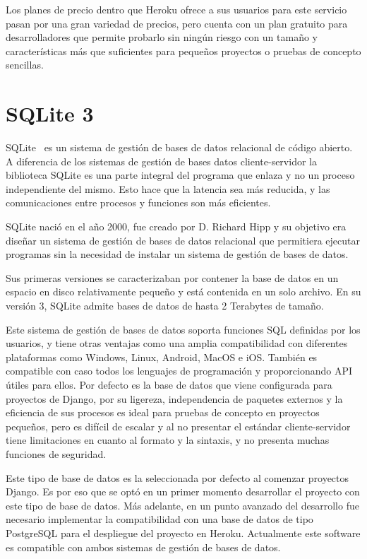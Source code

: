 \documentclass[a4paper, 12pt]{book}
\begin{document}
Los planes de precio dentro que Heroku ofrece a sus usuarios para este servicio pasan por una gran variedad de precios, pero cuenta con un plan gratuito para desarrolladores que permite probarlo sin ningún riesgo con un tamaño y características más que suficientes para pequeños proyectos o pruebas de concepto sencillas. 

\section{SQLite 3}
\label{sec:SQLite}

SQLite~\cite{sqlite} es un sistema de gestión de bases de datos relacional de código abierto.  A diferencia de los sistemas de gestión de bases datos cliente-servidor la biblioteca SQLite es una parte integral del programa que enlaza y no un proceso independiente del mismo. Esto hace que la latencia sea más reducida, y las comunicaciones entre procesos y funciones son más eficientes. 

SQLite nació en el año 2000, fue creado por D. Richard Hipp y su objetivo era diseñar un sistema de gestión de bases de datos relacional que permitiera ejecutar programas sin la necesidad de instalar un sistema de gestión de bases de datos. 

Sus primeras versiones se caracterizaban por contener la base de datos en un espacio en disco relativamente pequeño y está contenida en un solo archivo. En su versión 3, SQLite admite bases de datos de hasta 2 Terabytes de tamaño. 

Este sistema de gestión de bases de datos soporta funciones SQL definidas por los usuarios, y tiene otras ventajas como una amplia compatibilidad con diferentes plataformas como Windows, Linux, Android, MacOS e iOS. También es compatible con caso todos los lenguajes de programación y proporcionando API útiles para ellos. Por defecto es la base de datos que viene configurada para proyectos de Django, por su ligereza, independencia de paquetes externos y la eficiencia de sus procesos es ideal para pruebas de concepto en proyectos pequeños, pero es difícil de escalar y al no presentar el estándar cliente-servidor tiene limitaciones en cuanto al formato y la sintaxis, y no presenta muchas funciones de seguridad.

Este tipo de base de datos es la seleccionada por defecto al comenzar proyectos Django. Es por eso que se optó en un primer momento desarrollar el proyecto con este tipo de base de datos. Más adelante, en un punto avanzado del desarrollo fue necesario implementar la compatibilidad con una base de datos de tipo PostgreSQL para el despliegue del proyecto en Heroku. Actualmente este software es compatible con ambos sistemas de gestión de bases de datos.
\end{document}
